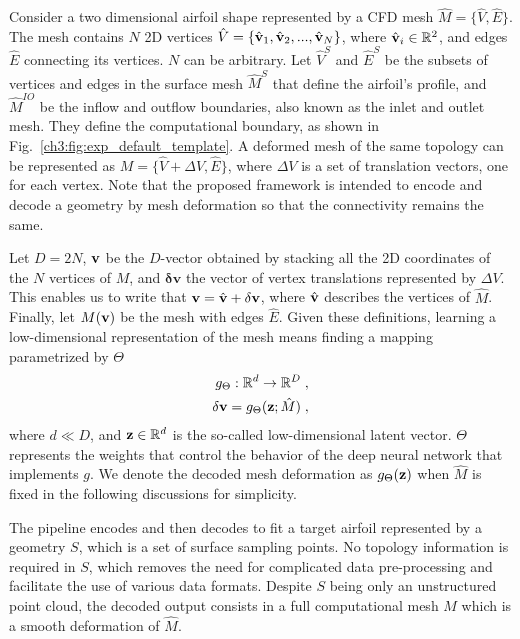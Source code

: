 Consider a two dimensional airfoil shape represented by a CFD mesh $\hat{M}=\{\hat{V},\hat{E}\}$. The mesh contains $N$ 2D vertices $\hat{V}=\{\hat{\mathbf{v}}_1, \hat{\mathbf{v}}_2, ..., \hat{\mathbf{v}}_N\}$, where $\hat{\mathbf{v}}_i \in \mathbb{R}^2$, and edges $\hat{E}$ connecting its vertices. $N$ can be arbitrary. Let $\hat{V}^S$ and $\hat{E}^S$ be the subsets of vertices and edges in the surface mesh $\hat{M}^S$ that define the airfoil's profile, and $\hat{M}^{IO}$ be the inflow and outflow boundaries, also known as the inlet and outlet mesh. They define the computational boundary, as shown in Fig.~\ref{ch3:fig:exp_default_template}. A deformed mesh of the same topology can be represented as ${M}=\{\hat{V}+\Delta V,\hat{E}\}$, where $\Delta V$ is a set of translation vectors, one for each vertex. Note that the proposed framework is intended to encode and decode a geometry by mesh deformation so that the connectivity remains the same.

Let $D=2N$, $\mathbf{v}$ be the $D$-vector obtained by stacking all the 2D coordinates of the $N$ vertices of $M$, and $\mathbf{\delta v}$ the vector of vertex translations represented by  $\Delta V$. This enables us to write that $\mathbf{v} = \hat{\mathbf{v}} +  \mathbf{\delta v}$, where $\hat{\mathbf{v}}$ describes the vertices of $\hat{M}$. Finally, let $M(\mathbf{v})$ be the mesh with edges $\hat{E}$. Given these definitions, learning a low-dimensional representation of the mesh means finding a mapping parametrized by $\Theta$
%
\begin{align}
    g_{\Theta} : \mathbb{R}^d \rightarrow \mathbb{R}^D \; , \label{ch3:eq:map} \\
    \mathbf{\delta v} = g_{\Theta}(\mathbf{z}; \hat{M}) \; , \nonumber
\end{align} 
%
where $d \ll D$, and $\mathbf{z}\in \mathbb{R}^d$ is the so-called low-dimensional latent vector. $\Theta$ represents the weights that control the behavior of the deep neural network that implements $g$. 
We denote the decoded mesh deformation as $g_\Theta(\mathbf{z})$ when $\hat{M}$ is fixed in the following discussions for simplicity. 

The pipeline encodes and then decodes to fit a target airfoil represented by a geometry $S$, which is a set of surface sampling points.
No topology information is required in $S$, which removes the need for complicated data pre-processing and facilitate the use of various data formats. Despite $S$ being only an unstructured point cloud, the decoded output consists in a full computational mesh $M$ which is a smooth deformation of $\hat{M}$.

